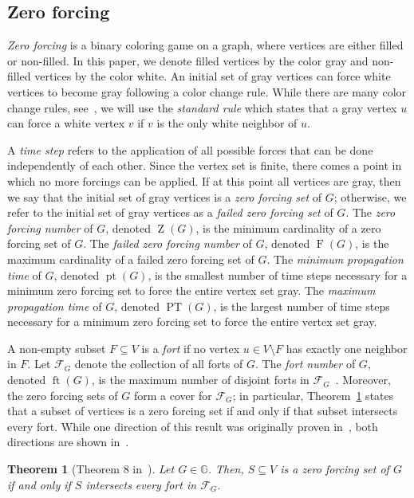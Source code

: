 \documentclass[twoside, 12pt]{article}
\newtheorem{theorem}{Theorem}[section]
\theoremstyle{definition}
\DeclareMathOperator{\Z}{Z}
\DeclareMathOperator{\F}{F}
\DeclareMathOperator{\pt}{pt}
\DeclareMathOperator{\PT}{PT}
\DeclareMathOperator{\ft}{ft}
\begin{document}
\subsection{Zero forcing}
\emph{Zero forcing} is a binary coloring game on a graph, where vertices are either filled or non-filled. 
In this paper, we denote filled vertices by the color gray and non-filled vertices by the color white. 
An initial set of gray vertices can force white vertices to become gray following a color change rule. 
While there are many color change rules, see~\cite[Chapter 9]{Hogben2022}, we will use the \emph{standard rule} which states that a gray vertex $u$ can force a white vertex $v$ if $v$ is the only white neighbor of $u$.

A \emph{time step} refers to the application of all possible forces that can be done independently of each other. 
Since the vertex set is finite, there comes a point in which no more forcings can be applied. 
If at this point all vertices are gray, then we say that the initial set of gray vertices is a \emph{zero forcing set} of $G$; otherwise, we refer to the initial set of gray vertices as a \emph{failed zero forcing set} of $G$.
The \emph{zero forcing number} of $G$, denoted $\Z(G)$, is the minimum cardinality of a zero forcing set of $G$.
The \emph{failed zero forcing number} of $G$, denoted $\F(G)$, is the maximum cardinality of a failed zero forcing set of $G$.
The \emph{minimum propagation time} of $G$, denoted $\pt(G)$, is the smallest number of time steps necessary for a minimum zero forcing set to force the entire vertex set gray. 
The \emph{maximum propagation time} of $G$, denoted $\PT(G)$, is the largest number of time steps necessary for a minimum zero forcing set to force the entire vertex set gray.

A non-empty subset $F\subseteq V$ is a \emph{fort} if no vertex $u\in V\setminus{F}$ has exactly one neighbor in $F$.
Let $\mathcal{F}_{G}$ denote the collection of all forts of $G$. 
The \emph{fort number} of $G$, denoted $\ft(G)$, is the maximum number of disjoint forts in $\mathcal{F}_{G}$~\cite{Cameron2023}. 
Moreover, the zero forcing sets of $G$ form a cover for $\mathcal{F}_{G}$; in particular, Theorem~\ref{thm:fort_cover} states that a subset of vertices is a zero forcing set if and only if that subset intersects every fort. 
While one direction of this result was originally proven in~\cite[Theorem 3]{Fast2018}, both directions are shown in~\cite[Theorem 8]{Brimkov2019}.
\begin{theorem}[Theorem 8 in~\cite{Brimkov2019}]\label{thm:fort_cover}
Let $G\in\mathbb{G}$.
Then, $S\subseteq V$ is a zero forcing set of $G$ if and only if $S$ intersects every fort in $\mathcal{F}_{G}$.
\end{theorem}
\end{document}
